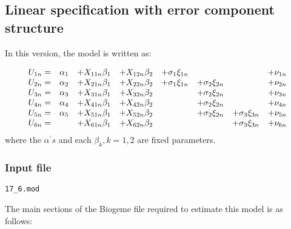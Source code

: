 \documentclass[12pt]{memoir}
\begin{document}
\subsection{Linear specification with error component structure}

In this version, the model is written as:%

\begin{equation}%
\begin{array}
[c]{cccccccc}%
U_{1n}= & \alpha_{1} & +X_{11n}\beta_{1} & +X_{12n}\beta_{2} & +\sigma_{1}%
\xi_{1n} &  &  & +\nu_{1n}\\
U_{2n}= & \alpha_{2} & +X_{21n}\beta_{1} & +X_{22n}\beta_{2} & +\sigma_{1}%
\xi_{1n} & +\sigma_{2}\xi_{2n} &  & +\nu_{2n}\\
U_{3n}= & \alpha_{3} & +X_{31n}\beta_{1} & +X_{32n}\beta_{2} &  & +\sigma
_{2}\xi_{2n} &  & +\nu_{3n}\\
U_{4n}= & \alpha_{4} & +X_{41n}\beta_{1} & +X_{42n}\beta_{2} &  & +\sigma
_{2}\xi_{2n} &  & +\nu_{4n}\\
U_{5n}= & \alpha_{5} & +X_{51n}\beta_{1} & +X_{52n}\beta_{2} &  & +\sigma
_{2}\xi_{2n} & +\sigma_{3}\xi_{3n} & +\nu_{5n}\\
U_{6n}= &  & +X_{61n}\beta_{1} & +X_{62n}\beta_{2} &  &  & +\sigma_{3}\xi_{3n}
& +\nu_{6n}%
\end{array}
\end{equation}
where the $\alpha^{\prime}s$ and each $\beta_{k},k=1,2$ are fixed
parameters$.$

\subsubsection{Input file}

\begin{flushright}
  \verb+17_6.mod+
\end{flushright}

The main sections of the Biogeme file required to estimate this model is as follows:
\end{document}
